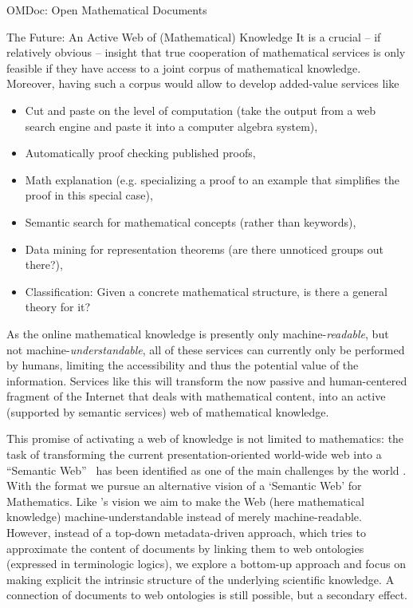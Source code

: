 \begin{tchapter}[id=omdoc-markup,short=Open Mathematical Documents]{OMDoc: Open Mathematical Documents}
\begin{tsection}[id=mathweb]{The Future: An Active Web of (Mathematical) Knowledge}
It is a crucial -- if relatively obvious -- insight that true cooperation of
mathematical services is only feasible if they have access to a joint corpus of
mathematical knowledge. Moreover, having such a corpus would allow to develop
added-value services like
\begin{itemize}
\item Cut and paste on the level of computation (take the output from a web search engine
  and paste it into a computer algebra system),
\item Automatically proof checking published proofs,
\item Math explanation (e.g. specializing a proof to an example that simplifies the proof
  in this special case),
\item Semantic search for mathematical concepts (rather than keywords),
\item Data mining for representation theorems (are there unnoticed groups out there?),
\item Classification: Given a concrete mathematical structure, is there a general theory
  for it?
\end{itemize}
As the online mathematical knowledge is presently only machine-{\emph{readable}}, but not
machine-{\emph{understandable}}, all of these services can currently only be performed by
humans, limiting the accessibility and thus the potential value of the
information. Services like this will transform the now passive and human-centered fragment
of the Internet that deals with mathematical content, into an active (supported by
semantic services) web of mathematical knowledge.

This promise of activating a web of knowledge is not limited to mathematics: the task of
transforming the current presentation-oriented world-wide web into a ``Semantic
Web''~\cite{BernersLee:tsw98} has been identified as one of the main challenges by the
world {}. With the {\omdoc} format we pursue an alternative vision of a
`Semantic Web' for Mathematics. Like {}'s vision we aim to make
the Web (here mathematical knowledge) machine-understandable instead of merely
machine-readable. However, instead of a top-down metadata-driven approach, which tries to
approximate the content of documents by linking them to web ontologies (expressed in
terminologic logics), we explore a bottom-up approach and focus on making explicit the
intrinsic structure of the underlying scientific knowledge. A connection of documents to
web ontologies is still possible, but a secondary effect.


\end{tsection}
\end{tchapter}
